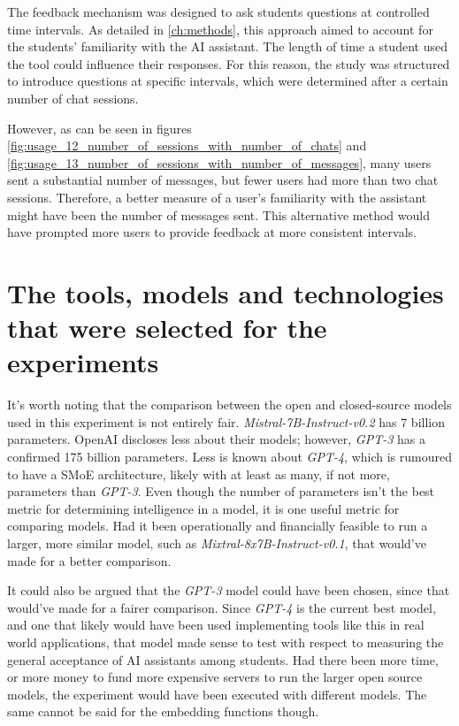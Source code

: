 The feedback mechanism was designed to ask students questions at controlled time intervals. As detailed in \autoref{ch:methods}, this approach aimed to account for the students' familiarity with the AI assistant. The length of time a student used the tool could influence their responses. For this reason, the study was structured to introduce questions at specific intervals, which were determined after a certain number of chat sessions.


However, as can be seen in figures \ref{fig:usage_12_number_of_sessions_with_number_of_chats} and \ref{fig:usage_13_number_of_sessions_with_number_of_messages}, many users sent a substantial number of messages, but fewer users had more than two chat sessions. Therefore, a better measure of a user's familiarity with the assistant might have been the number of messages sent. This alternative method would have prompted more users to provide feedback at more consistent intervals.


\section{The tools, models and technologies that were selected for the experiments}


It's worth noting that the comparison between the open and closed-source models used in this experiment is not entirely fair. \textit{Mistral-7B-Instruct-v0.2} has 7 billion parameters. OpenAI discloses less about their models; however, \textit{GPT-3} has a confirmed 175 billion parameters. Less is known about \textit{GPT-4}, which is rumoured to have a \gls{SMoE} architecture, likely with at least as many, if not more, parameters than \textit{GPT-3}. Even though the number of parameters isn’t the best metric for determining intelligence in a model, it is one useful metric for comparing models. Had it been operationally and financially feasible to run a larger, more similar model, such as \textit{Mixtral-8x7B-Instruct-v0.1}, that would’ve made for a better comparison.


It could also be argued that the \textit{GPT-3} model could have been chosen, since that would’ve made for a fairer comparison. Since \textit{GPT-4} is the current best model, and one that likely would have been used implementing tools like this in real world applications, that model made sense to test with respect to measuring the general acceptance of AI assistants among students. Had there been more time, or more money to fund more expensive servers to run the larger open source models, the experiment would have been executed with different models. The same cannot be said for the embedding functions though.


